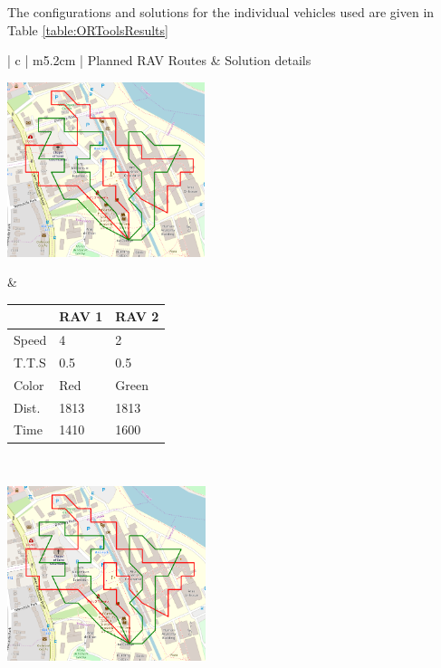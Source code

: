 The configurations and solutions for the individual vehicles used are given in Table \ref{table:ORToolsResults}
\begin{table}[h!]
  \centering
  \begin{tabular}{ | c | m{5.2cm} | }
    \hline
    Planned RAV Routes & Solution details \\
    \hline
    
    \begin{minipage}[c][53mm][c]{.6\textwidth}
      \includegraphics[width=\linewidth, height=51mm]{Chapters/MultiAgentCoverage/MultipleTravellingSalesman/Figs/ORToolsSolns/Example1.PNG}

    \end{minipage}
    &
    \small
    \begin{tabular}{m{10mm}|m{11mm} m{11mm}}
        & RAV 1 & RAV 2\\
        \hline
        Speed& 4 & 2 \\
        T.T.S & 0.5 & 0.5 \\
        Color & Red & Green \\
        \hline
        Dist.& 1813 & 1813 \\
        Time& 1410 & 1600 \\
    \end{tabular}
    \normalsize
    \\
    \hline
    \begin{minipage}[c][53mm][c]{.6\textwidth}
      \includegraphics[width=\linewidth, height=51mm]{Chapters/MultiAgentCoverage/MultipleTravellingSalesman/Figs/ORToolsSolns/Example2.PNG}


\end{minipage}
\end{tabular}
\end{table}
